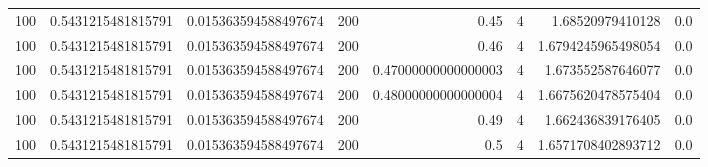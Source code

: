 \documentclass[11pt]{article}
\begin{document}
\begin{center}
\begin{tabular}{rrrrrrrr}
100 & 0.5431215481815791 & 0.015363594588497674 & 200 & 0.45 & 4 & 1.68520979410128 & 0.0\\
100 & 0.5431215481815791 & 0.015363594588497674 & 200 & 0.46 & 4 & 1.6794245965498054 & 0.0\\
100 & 0.5431215481815791 & 0.015363594588497674 & 200 & 0.47000000000000003 & 4 & 1.673552587646077 & 0.0\\
100 & 0.5431215481815791 & 0.015363594588497674 & 200 & 0.48000000000000004 & 4 & 1.6675620478575404 & 0.0\\
100 & 0.5431215481815791 & 0.015363594588497674 & 200 & 0.49 & 4 & 1.662436839176405 & 0.0\\
100 & 0.5431215481815791 & 0.015363594588497674 & 200 & 0.5 & 4 & 1.6571708402893712 & 0.0\\
\hline
\end{tabular}
\end{center}
\end{document}
